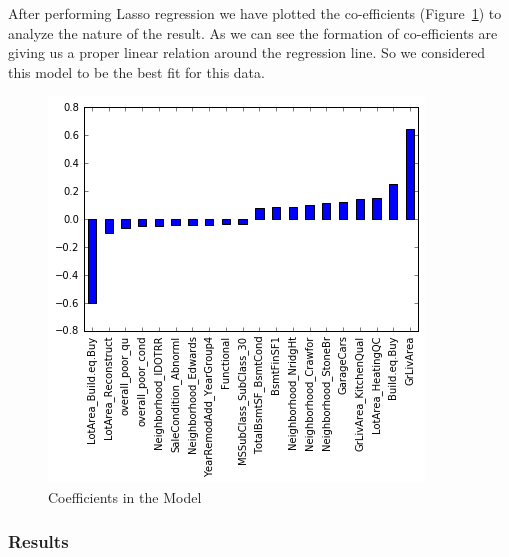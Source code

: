 \documentclass[fleqn,10pt]{SelfArx} %
\begin{document}
After performing Lasso regression we have plotted the co-efficients (Figure~\ref{fig:Figure1}) to analyze the nature of the result.
As we can see the formation of co-efficients are giving us a proper linear relation around the regression line. So we considered this model to be the best fit for this data. 

\begin{figure}[ht]\centering %
\includegraphics[width=\linewidth]{Figure1}
\caption{Coefficients in the Model}
\label{fig:Figure1}
\end{figure}

\subsubsection{Results}
\end{document}

